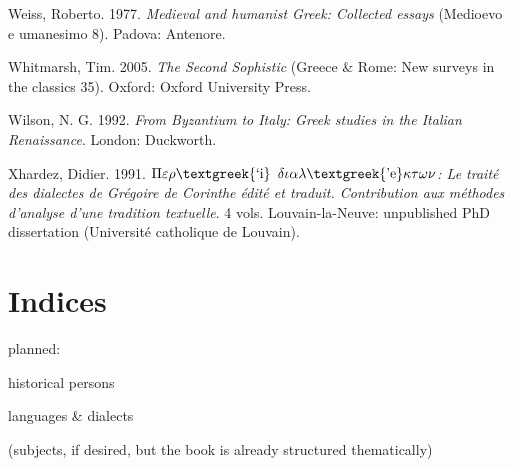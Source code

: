 \begin{styleStandard}
Weiss, Roberto. 1977. \textit{Medieval and humanist Greek: Collected essays} (Medioevo e umanesimo 8). Padova: Antenore.
\end{styleStandard}

\begin{styleStandard}
Whitmarsh, Tim. 2005. \textit{The Second Sophistic} (Greece \& Rome: New surveys in the classics 35). Oxford: Oxford University Press.
\end{styleStandard}

\begin{styleStandard}
Wilson, N. G. 1992. \textit{From Byzantium to Italy: Greek studies in the Italian Renaissance}. London: Duckworth.
\end{styleStandard}

\begin{styleStandard}
Xhardez, Didier. 1991. \textit{$\Pi \varepsilon \rho \text{\textgreek{`i}}$ $\delta \iota \alpha \lambda \text{\textgreek{'e}}\kappa \tau \omega \nu $: Le traité des dialectes de Grégoire de Corinthe édité et traduit. Contribution aux méthodes d’analyse d’une tradition textuelle}. 4 vols. Louvain-la-Neuve: unpublished PhD dissertation (Université catholique de Louvain).
\end{styleStandard}

\clearpage\section{Indices}
\hypertarget{Toc19704873}{}\begin{styleStandard}
planned:
\end{styleStandard}

\begin{listWWNumxxxivleveli}
\item 
\begin{styleListParagraph}
historical persons
\end{styleListParagraph}
\item 
\begin{styleListParagraph}
languages \& dialects
\end{styleListParagraph}
\item 
\begin{styleListParagraph}
(subjects, if desired, but the book is already structured thematically)
\end{styleListParagraph}
\end{listWWNumxxxivleveli}
